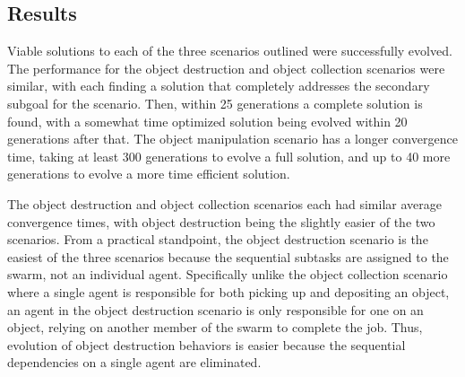 \clearpage

\subsection{Results}

Viable solutions to each of the three scenarios outlined were successfully evolved.  The performance for the object destruction and object collection  scenarios were similar, with each finding a solution that completely addresses the secondary subgoal for the scenario.  Then, within 25 generations a complete solution is found, with a somewhat time optimized solution being evolved within 20 generations after that.  The object manipulation scenario has a longer convergence time, taking at least 300 generations to evolve a full solution, and up to 40 more generations to evolve a more time efficient solution.

The object destruction and object collection scenarios each had similar average convergence times, with object destruction being the slightly easier of the two scenarios.  From a practical standpoint, the object destruction scenario is the easiest of the three scenarios because the sequential subtasks are assigned to the swarm, not an individual agent.  Specifically unlike the object collection scenario where a single agent is responsible for both picking up and depositing an object, an agent in the object destruction scenario is only responsible for one  on an object, relying on another member of the swarm to complete the job.  Thus, evolution of object destruction behaviors is easier because the sequential dependencies on a single agent are eliminated. 

